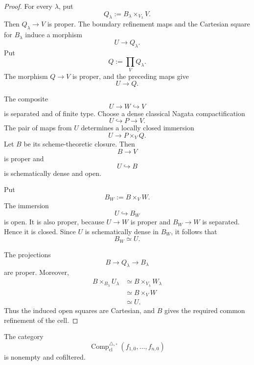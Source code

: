 \begin{proof}
For every \(\lambda\), put
\[
    Q_\lambda
    :=
    B_\lambda\times_{V_\lambda}V.
\]
Then \(Q_\lambda\to V\) is proper.  The boundary refinement maps and the
Cartesian square for \(B_\lambda\) induce a morphism
\[
    U\longrightarrow Q_\lambda.
\]
Put
\[
    Q
    :=
    \prod_VQ_\lambda.
\]
The morphism \(Q\to V\) is proper, and the preceding maps give
\[
    U\longrightarrow Q.
\]

The composite
\[
    U\longrightarrow W\hookrightarrow V
\]
is separated and of finite type.  Choose a dense classical Nagata
compactification
\[
    U\hookrightarrow P\longrightarrow V.
\]
The pair of maps from \(U\) determines a locally closed immersion
\[
    U
    \longrightarrow
    P\times_VQ.
\]
Let \(B\) be its scheme-theoretic closure.  Then
\[
    B\longrightarrow V
\]
is proper and
\[
    U\hookrightarrow B
\]
is schematically dense and open.

Put
\[
    B_W
    :=
    B\times_VW.
\]
The immersion
\[
    U\hookrightarrow B_W
\]
is open.  It is also proper, because \(U\to W\) is proper and
\(B_W\to W\) is separated.  Hence it is closed.  Since \(U\) is
schematically dense in \(B_W\), it follows that
\[
    B_W
    \simeq
    U.
\]

The projections
\[
    B\longrightarrow Q_\lambda\longrightarrow B_\lambda
\]
are proper.  Moreover,
\[
\begin{aligned}
    B\times_{B_\lambda}U_\lambda
    &\simeq
    B\times_{V_\lambda}W_\lambda \\
    &\simeq
    B\times_VW \\
    &\simeq
    U.
\end{aligned}
\]
Thus the induced open squares are Cartesian, and \(B\) gives the required
common refinement of the cell.
\end{proof}

\begin{proposition}
\label{prop:classical-compactification-grids-cofiltered}
The category
\[
    \operatorname{Comp}^{\triangle,\square}_{\mathrm{cl}}
    (f_{1,0},\ldots,f_{n,0})
\]
is nonempty and cofiltered.
\end{proposition}

